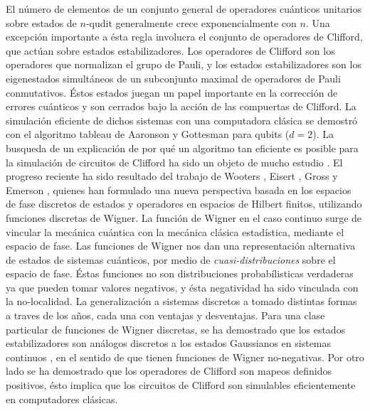 \documentclass[a4paper,11pt]{report}
\begin{document}
  El número de elementos de un conjunto general de
  operadores cuánticos unitarios sobre estados de $n$-qudit
  generalmente crece exponencialmente con $n$. Una excepción
  importante a ésta regla involucra el conjunto de
  operadores de Clifford, que actúan sobre estados
  estabilizadores. Los operadores de Clifford son los
  operadores que normalizan el grupo de Pauli, y los
  estados estabilizadores son los eigenestados simultáneos
  de un subconjunto maximal de operadores de Pauli
  conmutativos. Éstos estados juegan un papel importante
  en la corrección de errores cuánticos \cite{gottesman1998}
  y son cerrados bajo la acción de las compuertas de
  Clifford. La simulación eficiente de dichos sistemas con
  una computadora clásica se demostró con el algoritmo
  tableau de Aaronson y Gottesman \cite{aaronson2004,
  gottesman1998} para qubits ($d=2$). La busqueda de un
  explicación de por qué un algoritmo tan eficiente es
  posible para la simulación de circuitos de Clifford ha
  sido un objeto de mucho estudio \cite{gottesman1999,
  howard2014, mari2012}. El progreso reciente ha sido
  resultado del trabajo de Wooters \cite{wootters1987},
  Eisert \cite{mari2012}, Gross \cite{gross2006} y Emerson
  \cite{howard2014}, quienes han formulado una nueva
  perspectiva basada en los espacios de fase discretos de
  estados y operadores en espacios de Hilbert finitos,
  utilizando funciones discretas de Wigner.  La función de
  Wigner en el caso continuo surge de vincular la mecánica
  cuántica con la mecánica clásica estadística, mediante el
  espacio de fase. Las funciones de Wigner nos dan una
  representación alternativa de estados de sistemas
  cuánticos, por medio de \textit{cuasi-distribuciones}
  sobre el espacio de fase. Éstas funciones no son
  distribuciones probabílisticas verdaderas ya que pueden
  tomar valores negativos, y ésta negatividad ha sido
  vinculada con la no-localidad. La generalización a
  sistemas discretos a tomado distintas formas a traves de
  los años, cada una con ventajas y desventajas. Para una
  clase particular de funciones de Wigner discretas, se ha
  demostrado que los estados estabilizadores son análogos
  discretos a los estados Gaussianos en sistemas continuos
  \cite{gross2006}, en el sentido de que tienen funciones de
  Wigner no-negativas. Por otro lado se ha demostrado
  que los operadores de Clifford son mapeos definidos
  positivos, ésto implica que los circuitos de Clifford son
  simulables eficientemente en computadores clásicas.
\end{document}
